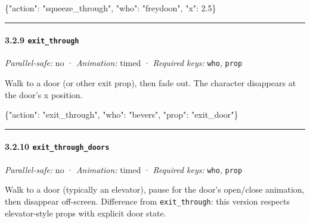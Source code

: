\documentclass[
  11pt,
]{book}
\newenvironment{Shaded}{}{}
\newcommand{\DataTypeTok}[1]{\textcolor[rgb]{0.56,0.13,0.00}{#1}}
\newcommand{\FloatTok}[1]{\textcolor[rgb]{0.25,0.63,0.44}{#1}}
\newcommand{\FunctionTok}[1]{\textcolor[rgb]{0.02,0.16,0.49}{#1}}
\newcommand{\StringTok}[1]{\textcolor[rgb]{0.25,0.44,0.63}{#1}}
\begin{document}
\begin{Shaded}
\begin{Highlighting}[]
\FunctionTok{\{}\DataTypeTok{"action"}\FunctionTok{:} \StringTok{"squeeze\_through"}\FunctionTok{,} \DataTypeTok{"who"}\FunctionTok{:} \StringTok{"freydoon"}\FunctionTok{,} \DataTypeTok{"x"}\FunctionTok{:} \FloatTok{2.5}\FunctionTok{\}}
\end{Highlighting}
\end{Shaded}

\begin{center}\rule{0.5\linewidth}{0.5pt}\end{center}

\paragraph{\texorpdfstring{3.2.9
\texttt{exit\_through}}{3.2.9 exit\_through}}\label{exit_through}

\emph{Parallel-safe:} no · \emph{Animation:} timed · \emph{Required
keys:} \texttt{who}, \texttt{prop}

Walk to a door (or other exit prop), then fade out. The character
disappears at the door's x position.

\begin{Shaded}
\begin{Highlighting}[]
\FunctionTok{\{}\DataTypeTok{"action"}\FunctionTok{:} \StringTok{"exit\_through"}\FunctionTok{,} \DataTypeTok{"who"}\FunctionTok{:} \StringTok{"bevers"}\FunctionTok{,} \DataTypeTok{"prop"}\FunctionTok{:} \StringTok{"exit\_door"}\FunctionTok{\}}
\end{Highlighting}
\end{Shaded}

\begin{center}\rule{0.5\linewidth}{0.5pt}\end{center}

\paragraph{\texorpdfstring{3.2.10
\texttt{exit\_through\_doors}}{3.2.10 exit\_through\_doors}}\label{exit_through_doors}

\emph{Parallel-safe:} no · \emph{Animation:} timed · \emph{Required
keys:} \texttt{who}, \texttt{prop}

Walk to a door (typically an elevator), pause for the door's open/close
animation, then disappear off-screen. Difference from
\texttt{exit\_through}: this version respects elevator-style props with
explicit door state.
\end{document}

